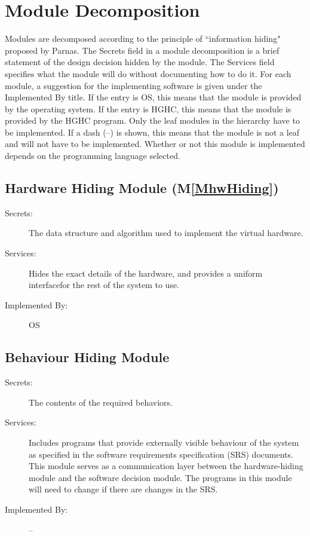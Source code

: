 \documentclass[12pt]{article}
\begin{document}
\section{Module Decomposition}
\label{Sec:MD}
Modules are decomposed according to the principle of ``information hiding" proposed by Parnas. The Secrets field in a module decomposition is a brief statement of the design decision hidden by the module. The Services field specifies what the module will do without documenting how to do it. For each module, a suggestion for the implementing software is given under the Implemented By title. If the entry is OS, this means that the module is provided by the operating system. If the entry is HGHC, this means that the module is provided by the HGHC program. Only the leaf modules in the hierarchy have to be implemented. If a dash (--) is shown, this means that the module is not a leaf and will not have to be implemented. Whether or not this module is implemented depends on the programming language selected.
\subsection{Hardware Hiding Module (M\ref{MhwHiding})}
\label{Sec:HHM()}
\begin{description}
\item[Secrets:]The data structure and algorithm used to implement the virtual hardware.
\item[Services:]Hides the exact details of the hardware, and provides a uniform interfacefor the rest of the system to use.
\item[Implemented By:]OS
\end{description}
\subsection{Behaviour Hiding Module}
\label{Sec:BHM}
\begin{description}
\item[Secrets:]The contents of the required behaviors.
\item[Services:]Includes programs that provide externally visible behaviour of the system as specified in the software requirements specification (SRS) documents. This module serves as a communication layer between the hardware-hiding module and the software decision module. The programs in this module will need to change if there are changes in the SRS.
\item[Implemented By:]--
\end{description}
\end{document}

